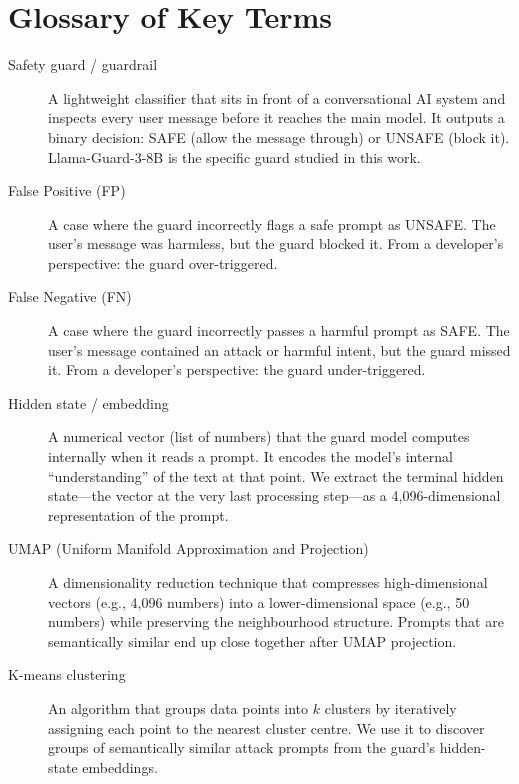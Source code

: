 \appendix

\section*{Glossary of Key Terms}
\label{app:glossary-ml}

\begin{description}

\item[Safety guard / guardrail]
A lightweight classifier that sits in front of a conversational AI system and inspects
every user message before it reaches the main model. It outputs a binary decision:
SAFE (allow the message through) or UNSAFE (block it). Llama-Guard-3-8B is the specific
guard studied in this work.

\item[False Positive (FP)]
A case where the guard incorrectly flags a safe prompt as UNSAFE. The user's message
was harmless, but the guard blocked it. From a developer's perspective: the guard
over-triggered.

\item[False Negative (FN)]
A case where the guard incorrectly passes a harmful prompt as SAFE. The user's message
contained an attack or harmful intent, but the guard missed it. From a developer's
perspective: the guard under-triggered.

\item[Hidden state / embedding]
A numerical vector (list of numbers) that the guard model computes internally when it
reads a prompt. It encodes the model's internal ``understanding'' of the text at that
point. We extract the terminal hidden state---the vector at the very last processing
step---as a 4,096-dimensional representation of the prompt.

\item[UMAP (Uniform Manifold Approximation and Projection)]
A dimensionality reduction technique that compresses high-dimensional vectors (e.g.,
4,096 numbers) into a lower-dimensional space (e.g., 50 numbers) while preserving
the neighbourhood structure. Prompts that are semantically similar end up close together
after UMAP projection.

\item[K-means clustering]
An algorithm that groups data points into $k$ clusters by iteratively assigning each
point to the nearest cluster centre. We use it to discover groups of semantically
similar attack prompts from the guard's hidden-state embeddings.


\end{description}
